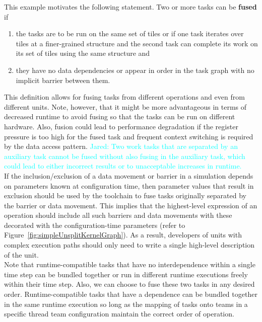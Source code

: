 \documentclass{article}
\newcommand{\Jared}[1]          {\textcolor{cyan}{Jared: #1}}
\begin{document}
This example motivates the following statement.  Two or more tasks can be
\textbf{fused} if
\begin{enumerate}
\item{the tasks are to be run on the same set of tiles or if one task 
iterates over tiles at a finer-grained structure and the second task can
complete its work on its set of tiles using the same structure and}
\item{they have no data dependencies or appear in order in the task graph with
no implicit barrier between them.}
\end{enumerate}
This definition allows for fusing tasks from different operations and even from
different units.
Note, however, that it might be more advantageous in terms of decreased runtime
to avoid fusing so that the tasks can be run on different hardware.  Also,
fusion could lead to performance degradation if the register pressure is too
high for the fused task and frequent context switching is required by the data
access pattern.  \Jared{Two work tasks that are separated by
an auxiliary task cannot be fused without also fusing in the auxiliary task,
which could lead to either incorrect results or to unacceptable increases in
runtime.}\\

If the inclusion/exclusion of a data movement or barrier in a simulation depends
on parameters known at configuration time, then parameter values that result in
exclusion should be used by the toolchain to fuse tasks originally separated by
the barrier or data movement.  This implies that the highest-level expression of
an operation should include all such barriers and data movements with these
decorated with the configuration-time parameters (refer to
Figure~\ref{fig:simpleUnsplitKernelGraph}).  As a result, developers of
units with complex execution paths should only need to write a single high-level
description of the unit.\\

Note that runtime-compatible tasks that have no interdependence within a single
time step can be bundled together or run in different runtime executions freely
within their time step.  Also, we can choose to fuse these two tasks in any
desired order.  Runtime-compatible tasks that have a dependence can be bundled
together in the same runtime execution so long as the mapping of tasks onto
teams in a specific thread team configuration maintain the correct order of
operation.\\
\end{document}
